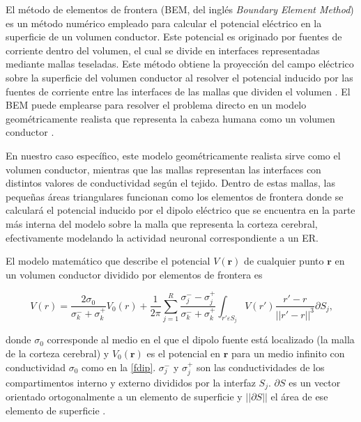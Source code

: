 El método de elementos de frontera (BEM, del inglés \emph{Boundary Element Method}) es un método numérico empleado para calcular el potencial eléctrico en la superficie de un volumen conductor. Este potencial es originado por fuentes de corriente dentro del volumen, el cual se divide en interfaces representadas mediante mallas teseladas. Este método obtiene la proyección del campo eléctrico sobre la superficie del volumen conductor al resolver el potencial inducido por las fuentes de corriente entre las interfaces de las mallas que dividen el volumen \cite{Hallez2007}. El BEM puede emplearse para resolver el problema directo en un modelo geométricamente realista que representa la cabeza humana como un volumen conductor \cite{Ermer2001}.

En nuestro caso específico, este modelo geométricamente realista sirve como el volumen conductor, mientras que las mallas representan las interfaces con distintos valores de conductividad según el tejido. Dentro de estas mallas, las pequeñas áreas triangulares funcionan como los elementos de frontera donde se calculará el potencial inducido por el dipolo eléctrico que se encuentra en la parte más interna del modelo sobre la malla que representa la corteza cerebral, efectivamente modelando la actividad neuronal correspondiente a un ER.

El modelo matemático que describe el potencial $V(\mathbf{r})$ de cualquier punto $\mathbf{r}$ en un volumen conductor dividido por elementos de frontera es

\begin{equation}
	\label{bem}
	V(r) = \frac{2\sigma_{0}}{\sigma_{k}^{-} + {\sigma_{k}^{+}}} V_{0}(r) + \frac{1}{2\pi} \sum_{j=1}^{R}\frac{\sigma_{j}^{-}-\sigma_{j}^{+}}{\sigma_{k}^{-}+\sigma_{k}^{+}} \int_{r'\varepsilon S_{j}} V(r') \frac{r'-r}{||r'-r||^3}\partial S_{j}\text{,}
\end{equation}

donde $\sigma_{0}$ corresponde al medio en el que el dipolo fuente está localizado (la malla de la corteza cerebral) y $V_{0}(\mathbf{r})$ es el potencial en $\mathbf{r}$ para un medio infinito con conductividad $\sigma_{0}$ como en la \cref{fdip}. $\sigma_{j}^{-}$ y $\sigma_{j}^{+}$ son las conductividades de los compartimentos interno y externo divididos por la interfaz $S_{j}$. $\partial S$ es un vector orientado ortogonalmente a un elemento de superficie y $||\partial S||$ el área de ese elemento de superficie \cite{Hallez2007}. 

